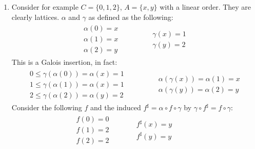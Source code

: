 \begin{exercise}
\begin{enumerate}[1.]
\begin{itemize}
        \end{itemize}
        \item Consider for example $C = \{0, 1, 2\}$, $A = \{x, y\}$ with a linear order. They are clearly lattices. $\alpha$ and $\gamma$ as defined as the following:
        \begin{gather*}
            \begin{aligned}
                \alpha(0) = x \\
                \alpha(1) = x \\
                \alpha(2) = y
            \end{aligned}
            \qquad\qquad
            \begin{aligned}
                \gamma(x) = 1 \\
                \gamma(y) = 2
            \end{aligned}
        \end{gather*}
        This is a Galois insertion, in fact:
        \begin{gather*}
            \begin{aligned}
                0 \leq \gamma(\alpha(0)) = \alpha(x) = 1 \\
                1 \leq \gamma(\alpha(1)) = \alpha(x) = 1 \\
                2 \leq \gamma(\alpha(2)) = \alpha(y) = 2
            \end{aligned}
            \qquad\qquad
            \begin{aligned}
                \alpha(\gamma(x)) = \alpha(1) = x \\
                \alpha(\gamma(y)) = \alpha(2) = y
            \end{aligned}
        \end{gather*}
        Consider the following $f$ and the induced $f^\sharp = \alpha \circ f \circ \gamma$ by $\gamma \circ f^\sharp = f \circ \gamma$:
        \begin{gather*}
            \begin{aligned}
                f(0) = 0 \\
                f(1) = 2 \\
                f(2) = 2
            \end{aligned}
            \qquad\quad
            \begin{aligned}
                f^\sharp (x) = y \\
                f^\sharp (y) = y
            \end{aligned}
            \qquad\quad

\end{gather*}
\end{enumerate}
\end{exercise}
